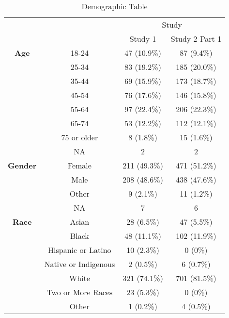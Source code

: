 \begin{table}[p]
\centering
\caption{\label{tab:demographics}Demographic Table}
\centering
\begin{tabular}[t]{>{}cccc}
\toprule
\multicolumn{2}{c}{ } & \multicolumn{2}{c}{Study} \\
\cmidrule(l{3pt}r{3pt}){3-4}
  &   & Study 1 & Study 2 Part 1\\
\midrule
\textbf{Age} & 18-24 & 47 (10.9\%) & 87 (9.4\%)\\

 & 25-34 & 83 (19.2\%) & 185 (20.0\%)\\

 & 35-44 & 69 (15.9\%) & 173 (18.7\%)\\

 & 45-54 & 76 (17.6\%) & 146 (15.8\%)\\

 & 55-64 & 97 (22.4\%) & 206 (22.3\%)\\

 & 65-74 & 53 (12.2\%) & 112 (12.1\%)\\

 & 75 or older & 8 (1.8\%) & 15 (1.6\%)\\

 & NA & 2 & 2\\
\cmidrule{1-4}
\textbf{Gender} & Female & 211 (49.3\%) & 471 (51.2\%)\\

 & Male & 208 (48.6\%) & 438 (47.6\%)\\

 & Other & 9 (2.1\%) & 11 (1.2\%)\\

 & NA & 7 & 6\\
\cmidrule{1-4}
\textbf{Race} & Asian & 28 (6.5\%) & 47 (5.5\%)\\

 & Black & 48 (11.1\%) & 102 (11.9\%)\\

 & Hispanic or Latino & 10 (2.3\%) & 0 (0\%)\\

 & Native or Indigenous & 2 (0.5\%) & 6 (0.7\%)\\

 & White & 321 (74.1\%) & 701 (81.5\%)\\

 & Two or More Races & 23 (5.3\%) & 0 (0\%)\\

 & Other & 1 (0.2\%) & 4 (0.5\%)\\


\end{tabular}
\end{table}
